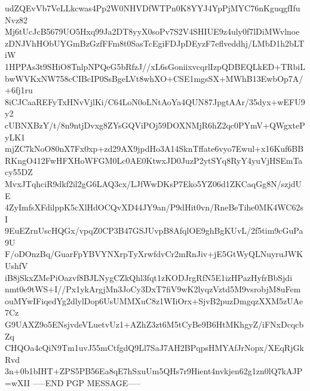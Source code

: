udZQEvVb7VeLLkcwas4Pp2W0NHVDfWTPn0K8YYJ4YpPjMYC76nKguqgfIfuNvz82
Mj6tUcJcB5679UO5Hxq99Ja2DT8yyX0soPv7S2V4SHIUE9z4uly0f7lDiMWvlnoe
zDNJVhHObUYGmBzGzfFFm8t0SasTcEgiFDJpDEyzF7eflveddhj/LMbD1h2bLTiW
1HPPAs3t9SHiO8TnlpNPQeG5bRfzJ//xL6sGoniixvcqrlIzpQDBEQLkED+TRbiL
bwWVKxNW758cCIBcIP0SsBgeLVt8whXO+CSE1mgsSX+MWhB13EwbOp7A/+6fj1ru
8iCJCaaREFyTxHNvVjlKi/C64LoN0oLNtAoYa4QUN87JpgtAAr/35dyx+wEFU9y2
cUBNXBzY/t/8n9ntjDvxg8ZYsGQViPOj59DOXNMjR6hZ2qc0PYmV+QWgxtePyLK1
mjZC7kNoO80nX7Fx0xp+zd29AX9jpdHo3A14SknTffate6vyo7Ewul+x16Kuf6BB
RKngO412FwHFXHoWFGM0Lc0AE0KtwxJD0JuzP2ytSYq8RyY4yuVjHSEmTacy55DZ
MvxJTqhciR9dkf2il2gG6LAQ3cx/LJfWwDKsP7Eko5YZ06d1ZKCaqGg8N/szjdUE
4ZyImfsXFdilppK5cXlHdOCQvXD44JY9an/P9dHit0vn/RneBeTihe0MK4WC62sI
9EuEZrnUscHQGx/vpqZ0CP3B47GSJUvpB8AfqlOE9ghBgKUvL/2f5tim9cGuPa9U
F/oDOnzBq/GuarFpYBVYNXrpTyXrwfdvCr2mRnJiv+jE5GtWyQLNuyruJWKUshfV
iB8jSkxZMePiOazvf8BJLNygCZkQhl3fqt1zKODJrgRfN5E1izHPazHyfrBbSjdi
nmt0e9tWS+I//Px1ykArgjMn3JoCy3DxT7fiV9wK2lyqzVztd5M9vsrobjM8uFem
ouMYwIFiqedYg2dlylDop6UsUMMXuC8z1WIiOrx+SjvB2puzDmgqzXXM5zUAe7Cz
G9UAXZ9o5ENsjvdeVLuetvUz1+AZhZ3zt6M5tCyBe9B6HtMKhgyZ/iFNxDcqcbZq
CHQOa4cQiN9Tm1uvJ55mCtfgdQ9Ll7SaJ7AH2BPqpsHMYAfJrNopx/XEqRjGkRvd
3n+0b1bIHT+ZPS5PB56Ea8qE7hSxuUm5QHs7r9Hient4nvkjen62g1zn0lQ7kAJP
=wXII
-----END PGP MESSAGE-----
